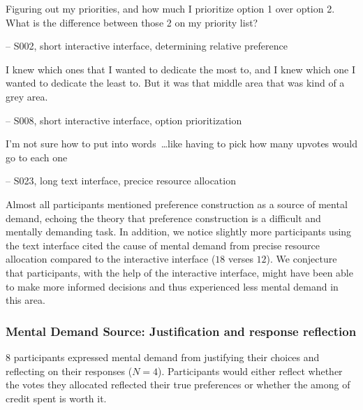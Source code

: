 \begin{displayquote}
Figuring out my priorities, and how much I prioritize option 1 over option 2. What is the difference between those 2 on my priority list?

\hfill -- S002, short interactive interface, determining relative preference
\end{displayquote}


\begin{displayquote}
I knew which ones that I wanted to dedicate the most to, and I knew which one I wanted to dedicate the least to. But it was that middle area that was kind of a grey area.
    
\noindent \hfill -- S008, short interactive interface, option prioritization
\end{displayquote}


\begin{displayquote}
I'm not sure how to put into words~\ldots like having to pick how many upvotes would go to each one
    
\noindent \hfill -- S023, long text interface, precice resource allocation
\end{displayquote}

Almost all participants mentioned preference construction as a source of mental demand, echoing the theory that preference construction is a difficult and mentally demanding task. In addition, we notice slightly more participants using the text interface cited the cause of mental demand from precise resource allocation compared to the interactive interface ($18$ verses $12$). We conjecture that participants, with the help of the interactive interface, might have been able to make more informed decisions and thus experienced less mental demand in this area.

\subsubsection{Mental Demand Source: Justification and response reflection} $8$ participants expressed mental demand from justifying their choices and reflecting on their responses ($N=4$). Participants would either reflect whether the votes they allocated reflected their true preferences or whether the among of credit spent is worth it.

